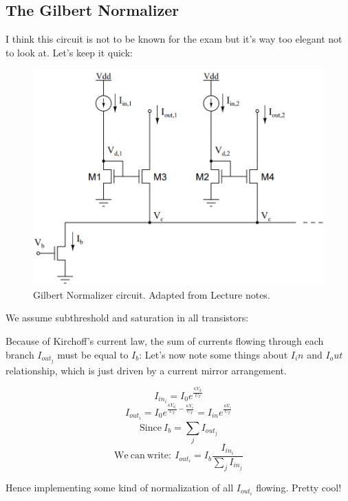 \subsection{The Gilbert Normalizer}

I think this circuit is not to be known for the exam but it's way too elegant not to look at. Let's keep it quick:

\begin{figure}[H]
    \centering
    \includegraphics[width=0.6\linewidth]{../../Figures/Gilbert_Normalizer.PNG}
    \caption{Gilbert Normalizer circuit. Adapted from Lecture notes.}
    \label{fig:Gilbert_Normalizer}
\end{figure}

We assume subthreshold and saturation in all transistors: 

Because of Kirchoff's current law, the sum of currents flowing through each branch $I_{out_j}$ must be equal to $I_b$: 
Let's now note some things about $I_in$ and $I_out$ relationship, which is just driven by a current mirror arrangement. 

\begin{equation}
    I_{in_i} = I_0 e^{\frac{\kappa V_d_i}{U_T}}
\end{equation}
\begin{equation}
    I_{out_i} = I_0 e^{\frac{\kappa V_d_i}{U_T} - \frac{\kappa V_c}{U_T}} = I_{in}e^{\frac{\kappa V_c}{U_T}}
\end{equation}
\begin{equation}
    \mathrm{Since \ } I_b = \sum_{j}^{}I_{out_j}
\end{equation}
\begin{equation}
    \mathrm{We \ can \ write: }\ I_{out_i} = I_b \frac{I_{in_i}}{\sum_{j}^{}I_{in_j}}
\end{equation}

Hence implementing some kind of normalization of all $I_{out_i}$ flowing. Pretty cool!